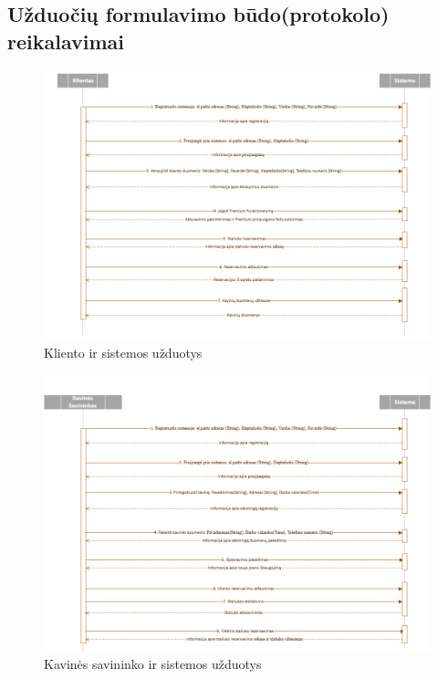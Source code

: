 \documentclass{VUMIFPSkursinis}
\begin{document}
\begin{landscape}
\subsection{Užduočių formulavimo būdo(protokolo) reikalavimai}
	\begin {figure}[H]
		\includegraphics[width=1.2\textwidth,height=1.3\textheight,keepaspectratio]{img/b}
		\caption{Kliento ir sistemos užduotys}
		\label{fig:b}
	\end{figure}
\end{landscape}

\begin{landscape}
	\begin {figure}[H]
		\includegraphics[width=1.3\textwidth,height=1.4\textheight,keepaspectratio]{img/c}
		\caption{Kavinės savininko ir sistemos užduotys}
		\label{fig:c}
	\end{figure}
\end{landscape}
\end{document}
